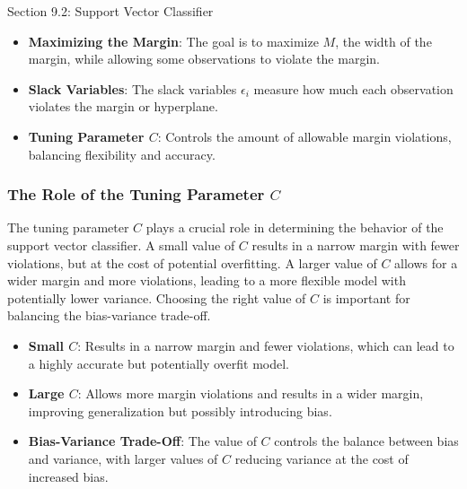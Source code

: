 \begin{notes}{Section 9.2: Support Vector Classifier}
    \begin{highlight}
        \begin{itemize}
            \item \textbf{Maximizing the Margin}: The goal is to maximize $M$, the width of the margin, while allowing some observations to violate the margin.
            \item \textbf{Slack Variables}: The slack variables $\epsilon_i$ measure how much each observation violates the margin or hyperplane.
            \item \textbf{Tuning Parameter $C$}: Controls the amount of allowable margin violations, balancing flexibility and accuracy.
        \end{itemize}
    \end{highlight}
    
    \subsubsection*{The Role of the Tuning Parameter $C$}
    
    The tuning parameter $C$ plays a crucial role in determining the behavior of the support vector classifier. A small value of $C$ results in a narrow margin with fewer violations, but at the cost of 
    potential overfitting. A larger value of $C$ allows for a wider margin and more violations, leading to a more flexible model with potentially lower variance. Choosing the right value of $C$ is important 
    for balancing the bias-variance trade-off.
    
    \begin{highlight}
        \begin{itemize}
            \item \textbf{Small $C$}: Results in a narrow margin and fewer violations, which can lead to a highly accurate but potentially overfit model.
            \item \textbf{Large $C$}: Allows more margin violations and results in a wider margin, improving generalization but possibly introducing bias.
            \item \textbf{Bias-Variance Trade-Off}: The value of $C$ controls the balance between bias and variance, with larger values of $C$ reducing variance at the cost of increased bias.
        \end{itemize}
    \end{highlight}
    

\end{notes}
